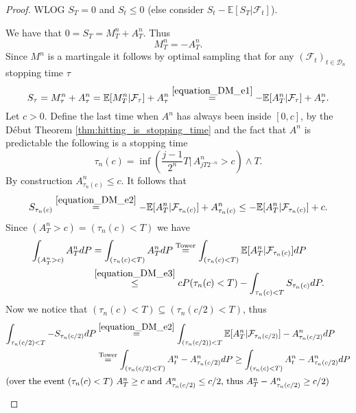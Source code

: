 \begin{proof}
  WLOG $S_T=0$ and $S_t\leq 0$ (else consider $S_t-\mathbb{E}\left[S_T\vert\mathcal{F}_{t}\right]$).

  We have that $0=S_T=M^n_T+A^n_T$. Thus
  \begin{equation}\label{equation_DM_e1}
  M^n_T=-A^n_T.
  \end{equation}
  Since $M^n$ is a martingale it follows by optimal sampling that for any $(\mathcal{F}_t)_{t\in\mathcal{D}_n}$ stopping time $\tau$
  \begin{equation}\label{equation_DM_e2}
  S_\tau=M^n_\tau+A^n_\tau = \mathbb{E}[M^n_T\vert\mathcal{F}_\tau]+A^n_\tau\stackrel{\eqref{equation_DM_e1}}{=} -\mathbb{E}[A^n_T\vert\mathcal{F}_\tau]+A^n_\tau.
  \end{equation}
  Let $c>0$. Define the last time when $A^n$ has always been inside $[0,c]$, by the Début Theorem \ref{thm:hitting_is_stopping_time} and the fact that $A^n$ is predictable the following is a stopping time
  $$
  \tau_n(c)=\inf\left(\frac{j-1}{2^n}T\vert\, A^n_{jT2^{-n}}>c\right)\wedge T.
  $$
  By construction $A^n_{\tau_n(c)}\leq c$. It follows that
  \begin{equation}\label{equation_DM_e3}
  S_{\tau_n(c)}\stackrel{\eqref{equation_DM_e2}}{=}-\mathbb{E}[A^n_T\vert\mathcal{F}_{\tau_n(c)}]+A^n_{\tau_n(c)}\leq -\mathbb{E}[A^n_T\vert\mathcal{F}_{\tau_n(c)}]+c.
  \end{equation}
  Since $(A^n_T>c)=(\tau_n(c)<T)$ we have
  \begin{align}\nonumber
  \int_{(A^n_T>c)}A^n_TdP&=\int_{(\tau_n(c)<T)}A^n_TdP\stackrel{\mathrm{Tower}}{=}\int_{(\tau_n(c)<T)}\mathbb{E}[A^n_T\vert\mathcal{F}_{\tau_n(c)}]dP\\
  &\stackrel{\eqref{equation_DM_e3}}{\leq} cP(\tau_n(c)<T)-\int_{\tau_n(c)<T}S_{\tau_n(c)}dP.\label{equation_DM_e4}
  \end{align}
  Now we notice that $(\tau_n(c)<T)\subseteq (\tau_n(c/2)<T)$, thus
  \begin{align}\nonumber
  \int_{\tau_n(c/2)<T}-S_{\tau_n(c/2)}dP&\stackrel{\eqref{equation_DM_e2}}{=}\int_{(\tau_n(c/2))<T}\mathbb{E}[A^n_T\vert\mathcal{F}_{\tau_n(c/2)}]-A^n_{\tau_n(c/2)}dP\\
  &\stackrel{\mathrm{Tower}}{=}\int_{(\tau_n(c/2)<T)}A^n_t-A^n_{\tau_n(c/2)}dP\geq \int_{(\tau_n(c)<T)}A^n_t-A^n_{\tau_n(c/2)}dP\nonumber\\
  \intertext{(over the event $(\tau_n(c)<T)$ $A^n_T\geq c$ and $A^n_{\tau_n(c/2)}\leq c/2$, thus $A^n_T-A^n_{\tau_n(c/2)}\geq c/2$)}

\end{align}
\end{proof}
